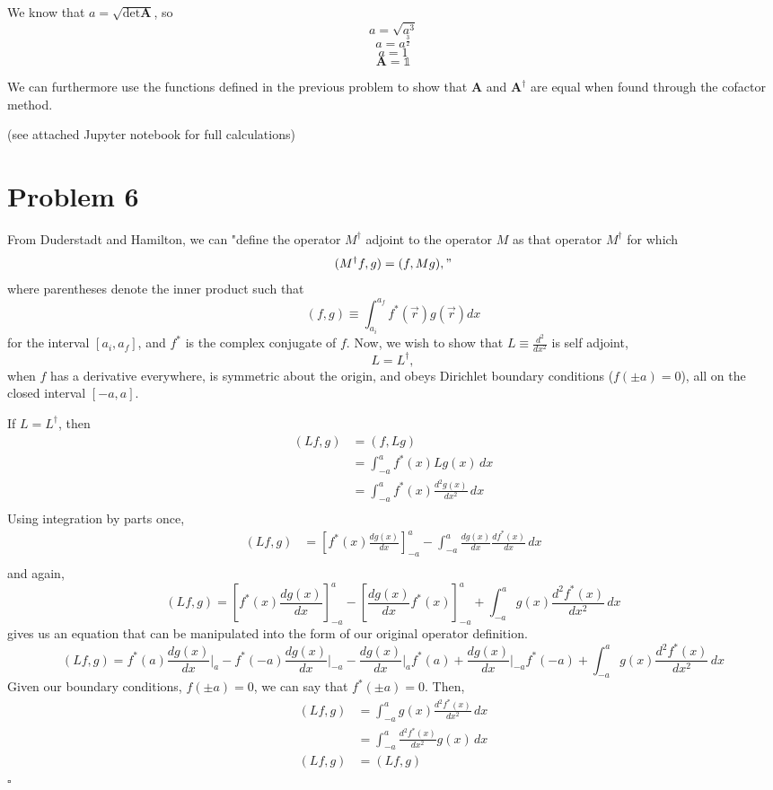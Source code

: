 \documentclass{article}
\newcommand{\tab}{\-\hspace{1cm}}
\newcommand{\pos}{\vec{r}}
\begin{document}
We know that $a = \sqrt{\det{\textbf{A}}}$, so
$$ a = \sqrt{a^3} $$
$$ a = a^{\frac{3}{2}} $$
$$ a = 1 $$
$$\boxed{ \textbf{A} = \mathbb{1} }$$

We can furthermore use the functions defined in the previous problem to show that $\textbf{A}$ and  $\textbf{A}^{\dagger}$ are equal when found through the cofactor method.

(see attached Jupyter notebook for full calculations)




\section*{Problem 6}

From Duderstadt and Hamilton, we can "define the operator $M^{\dagger}$ adjoint to the operator $M$ as that operator $M^{\dagger}$ for which
$$ (M^{\dagger}f,g) = (f,Mg) ,"$$
where parentheses denote the inner product such that
$$ (f,g) \equiv \int_{a_i}^{a_f} f^*(\pos)g(\pos) dx $$
for the interval $[a_i,a_f]$, and $f^*$ is the complex conjugate of $f$.
Now, we wish to show that $L \equiv \frac{d^2}{dx^2}$ is self adjoint,
$$ L = L^{\dagger} ,$$
when $f$ has a derivative everywhere, is symmetric about the origin, and obeys Dirichlet boundary conditions ($f(\pm a) = 0$), all on the closed interval $[-a,a]$.

If $L = L^{\dagger}$, then
\begin{align*}
(Lf,g)	&= (f,Lg) \\
		&= \int_{-a}^{a} f^*(x) Lg(x) \, dx \\
		&= \int_{-a}^{a} f^*(x) \frac{d^2g(x)}{dx^2} \, dx \\
\end{align*}
Using integration by parts once,
\begin{align*}
(Lf,g)	&= \left[f^*(x)\frac{dg(x)}{dx}\right]_{-a}^{a} - \int_{-a}^{a} \frac{dg(x)}{dx}\frac{df^*(x)}{dx} \, dx \\
\end{align*}
and again,
$$ (Lf,g) = \left[f^*(x)\frac{dg(x)}{dx}\right]_{-a}^{a} - \left[\frac{dg(x)}{dx}f^*(x)\right]_{-a}^{a} + \int_{-a}^{a} g(x)\frac{d^2f^*(x)}{dx^2} \, dx $$
gives us an equation that can be manipulated into the form of our original operator definition.
$$ (Lf,g) = f^*(a)\frac{dg(x)}{dx}\bigg|_{a} - f^*(-a)\frac{dg(x)}{dx}\bigg|_{-a} - \frac{dg(x)}{dx}\bigg|_{a}f^*(a) + \frac{dg(x)}{dx}\bigg|_{-a}f^*(-a) + \int_{-a}^{a} g(x)\frac{d^2f^*(x)}{dx^2} \, dx $$
Given our boundary conditions, $f(\pm a) = 0$, we can say that $f^*(\pm a) = 0$. Then,
\begin{align*}
(Lf,g)	&= \int_{-a}^{a} g(x)\frac{d^2f^*(x)}{dx^2} \, dx \\
		&= \int_{-a}^{a} \frac{d^2f^*(x)}{dx^2}g(x) \, dx \\
		(Lf,g)	&= (Lf,g)
\end{align*}
\tab\tab$\square$
\end{document}
